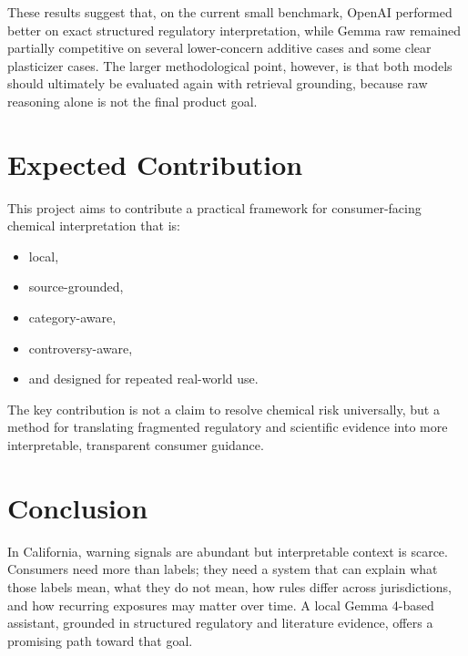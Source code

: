 \documentclass[11pt]{article}
\begin{document}
These results suggest that, on the current small benchmark, OpenAI performed better on exact structured regulatory interpretation, while Gemma raw remained partially competitive on several lower-concern additive cases and some clear plasticizer cases. The larger methodological point, however, is that both models should ultimately be evaluated again with retrieval grounding, because raw reasoning alone is not the final product goal.

\section{Expected Contribution}

This project aims to contribute a practical framework for consumer-facing chemical interpretation that is:

\begin{itemize}[leftmargin=1.5em]
\item local,
\item source-grounded,
\item category-aware,
\item controversy-aware,
\item and designed for repeated real-world use.
\end{itemize}

The key contribution is not a claim to resolve chemical risk universally, but a method for translating fragmented regulatory and scientific evidence into more interpretable, transparent consumer guidance.

\section{Conclusion}

In California, warning signals are abundant but interpretable context is scarce. Consumers need more than labels; they need a system that can explain what those labels mean, what they do not mean, how rules differ across jurisdictions, and how recurring exposures may matter over time. A local Gemma 4-based assistant, grounded in structured regulatory and literature evidence, offers a promising path toward that goal.
\end{document}
